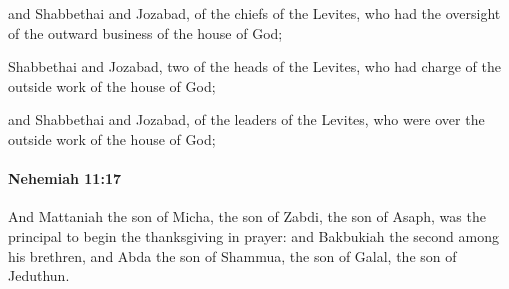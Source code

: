			\begin{versebox}
					\item[BHS] 
					\item[ASV] and Shabbethai and Jozabad, of the chiefs of the Levites, who had the oversight of the outward business of the house of God;
					\item[NIV] Shabbethai and Jozabad, two of the heads of the Levites, who had charge of the outside work of the house of God;
					\item[NRSV] and Shabbethai and Jozabad, of the leaders of the Levites, who were over the outside work of the house of God;
			\end{versebox}

		\paragraph{Nehemiah 11:17} %
			\label{NEHEMIAH-11-17}

			And Mattaniah the son of Micha, the son of Zabdi, the son of Asaph, was the principal to begin the thanksgiving in prayer: and Bakbukiah the second among his brethren, and Abda the son of Shammua, the son of Galal, the son of Jeduthun.

